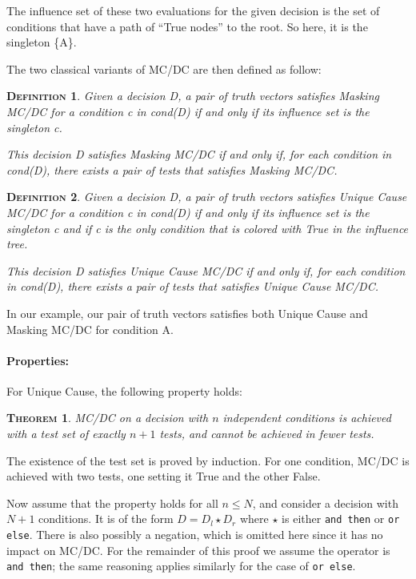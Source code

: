 \documentclass[a4paper,12pt,twoside]{article}
\renewcommand{\le}{\leqslant}
\newcommand{\anysc}{\star}
\newcommand{\andthen}{\texttt{and then}}
\newcommand{\orelse}{\texttt{or else}}
\newtheorem{theorem}{\textsc{Theorem}}
\newtheorem{definition}{\textsc{Definition}}
\begin{document}
The influence set of these two evaluations for the given decision is
the set of conditions that have a path of ``True nodes'' to the root.
So here, it is the singleton \{A\}.

The two classical variants of MC/DC are then defined as follow:

\begin{definition}
  \label{def:masking-mcdc}
  Given a decision D, a pair of truth vectors satisfies Masking MC/DC
  for a condition c in cond(D) if and only if its influence set is the
  singleton {c}.

  This decision D satisfies Masking MC/DC if and only if, for each
  condition in cond(D), there exists a pair of tests that satisfies
  Masking MC/DC.
\end{definition}

\begin{definition}
  \label{def:unique-cause}
  Given a decision D, a pair of truth vectors satisfies Unique Cause MC/DC
  for a condition c in cond(D) if and only if its influence set is the
  singleton {c} and if c is the only condition that is colored with True
  in the influence tree.

  This decision D satisfies Unique Cause MC/DC if and only if, for each
  condition in cond(D), there exists a pair of tests that satisfies
  Unique Cause MC/DC.
\end{definition}

In our example, our pair of truth vectors satisfies both Unique Cause and
Masking MC/DC for condition A.

\paragraph{Properties:}

For Unique Cause, the following property holds:

\begin{theorem}
MC/DC on a decision with $n$ independent conditions is achieved with
a test set of exactly $n+1$ tests, and cannot be achieved in fewer tests.
\end{theorem}

The existence of the test set is proved by induction. For one condition,
MC/DC is achieved with two tests, one setting it True and the other False.

Now assume that the property holds for all $n \le{} N$, and consider a decision
with $N+1$ conditions. It is of the form $D = D_l \anysc{} D_r$ where
$\anysc{}$ is either \andthen{} or \orelse{}. There is also possibly a
negation, which is omitted here since it has no impact on MC/DC. For the
remainder of this proof we assume the operator is \andthen{}; the same
reasoning applies similarly for the case of \orelse{}.
\end{document}
